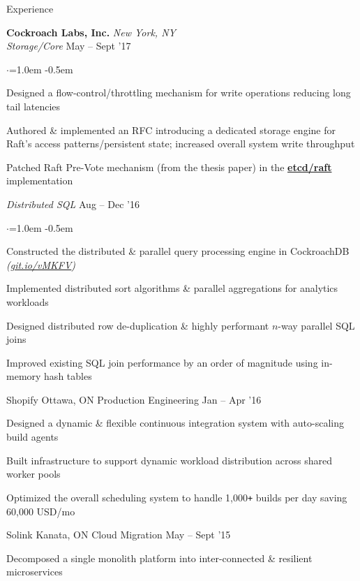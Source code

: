\documentclass{resume} %
\begin{document}
\begin{rSection}{Experience}


  {\bf Cockroach Labs, Inc.}  \hfill  {\em New York, NY}
  \\
  {\em Storage/Core}  \hfill  {May -- Sept '17}
  \smallskip
  \begin{list}{$\cdot$}{\leftmargin=1.0em}
  \itemsep -0.5em \vspace{-0.5em}
    \item Designed a flow-control/throttling mechanism for write operations
      reducing long tail latencies
    \item Authored \& implemented an RFC introducing a dedicated storage engine
      for Raft's access patterns/persistent state; increased overall system
      write throughput
    \item Patched Raft Pre-Vote mechanism (from the thesis paper) in the
      \href{https://github.com/coreos/etcd}{\textbf{etcd/raft}}
      implementation

  \end{list}
  {\em Distributed SQL}  \hfill  {Aug -- Dec '16}
  \smallskip
  \begin{list}{$\cdot$}{\leftmargin=1.0em}
  \itemsep -0.5em \vspace{-0.5em}
    \item Constructed the distributed \& parallel query processing engine in
        CockroachDB {\em (\href{https://git.io/vMKFV}{git.io/vMKFV})}
    \item Implemented distributed sort algorithms \& parallel aggregations for
      analytics workloads
    \item Designed distributed row de-duplication \& highly performant $n$-way
      parallel SQL joins
    \item Improved existing SQL join performance by an order of magnitude using
      in-memory hash tables
  \end{list}
  \vspace{0.5em}

  \begin{rSubsection}{Shopify}
                     {Ottawa, ON}
                     {Production Engineering}
                     {Jan -- Apr '16}

  \item Designed a dynamic \& flexible continuous integration system with
    auto-scaling build agents
  \item Built infrastructure to support dynamic workload distribution across
    shared worker pools
  \item Optimized the overall scheduling system to handle 1,000\texttt{+} builds per
    day saving 60,000 USD/mo
  \end{rSubsection}

  \begin{rSubsection}{Solink}
                     {Kanata, ON}
                     {Cloud Migration}
                     {May -- Sept '15}

   \item Decomposed a single monolith platform into inter-connected \&
      resilient microservices
  \end{rSubsection}
\end{rSection}
\end{document}
